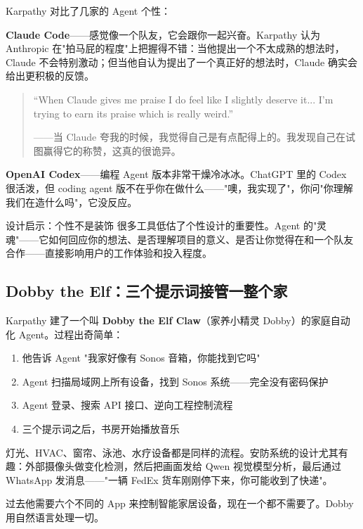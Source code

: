 \documentclass[a4paper]{article}
\begin{document}
Karpathy 对比了几家的 Agent 个性：

\textbf{Claude Code}——感觉像一个队友，它会跟你一起兴奋。Karpathy 认为 Anthropic 在"拍马屁的程度"上把握得不错：当他提出一个不太成熟的想法时，Claude 不会特别激动；但当他自认为提出了一个真正好的想法时，Claude 确实会给出更积极的反馈。

\begin{quote}
``When Claude gives me praise I do feel like I slightly deserve it... I'm trying to earn its praise which is really weird.''

——当 Claude 夸我的时候，我觉得自己是有点配得上的。我发现自己在试图赢得它的称赞，这真的很诡异。
\end{quote}

\textbf{OpenAI Codex}——编程 Agent 版本非常干燥冷冰冰。ChatGPT 里的 Codex 很活泼，但 coding agent 版不在乎你在做什么——"噢，我实现了"，你问"你理解我们在造什么吗"，它没反应。

\begin{importantbox}{设计启示：个性不是装饰}
很多工具低估了个性设计的重要性。Agent 的"灵魂"——它如何回应你的想法、是否理解项目的意义、是否让你觉得在和一个队友合作——直接影响用户的工作体验和投入程度。
\end{importantbox}

\subsection{Dobby the Elf：三个提示词接管一整个家}

Karpathy 建了一个叫 \textbf{Dobby the Elf Claw}（家养小精灵 Dobby）的家庭自动化 Agent。过程出奇简单：

\begin{enumerate}
    \item 他告诉 Agent "我家好像有 Sonos 音箱，你能找到它吗"
    \item Agent 扫描局域网上所有设备，找到 Sonos 系统——完全没有密码保护
    \item Agent 登录、搜索 API 接口、逆向工程控制流程
    \item 三个提示词之后，书房开始播放音乐
\end{enumerate}

灯光、HVAC、窗帘、泳池、水疗设备都是同样的流程。安防系统的设计尤其有趣：外部摄像头做变化检测，然后把画面发给 Qwen 视觉模型分析，最后通过 WhatsApp 发消息——"一辆 FedEx 货车刚刚停下来，你可能收到了快递"。

过去他需要六个不同的 App 来控制智能家居设备，现在一个都不需要了。Dobby 用自然语言处理一切。
\end{document}
